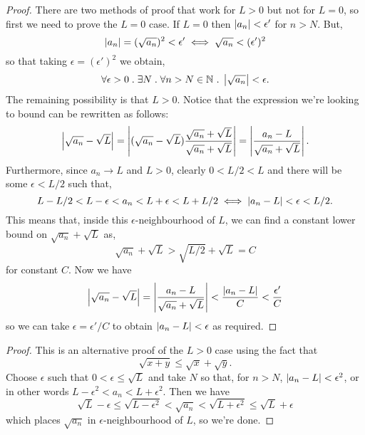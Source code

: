 \documentclass[../MathsNotesBase.tex]{subfiles}
\begin{document}
{\begin{exe}
{\begin{proof}
					There are two methods of proof that work for ${ L > 0 }$ but not for ${ L = 0 }$, so first we need to prove the ${ L = 0 }$ case. If ${ L = 0 }$ then ${ \left\lvert a_n\right\rvert < \epsilon' }$ for ${ n > N }$. But,
					\[ \left\lvert a_n\right\rvert = (\sqrt{a_n})^2 < \epsilon' \iff \sqrt{a_n} < (\epsilon')^2 \]
					so that taking ${ \epsilon = (\epsilon')^2 }$ we obtain,
					\[ \forall \epsilon > 0 \;.\; \exists N \;.\; \forall n > N \in \mathbb{N}^{} \;.\; \left\lvert\sqrt{a_n}\right\rvert < \epsilon. \]
					The remaining possibility is that ${ L > 0 }$. Notice that the expression we're looking to bound can be rewritten as follows:
					\[ \left\lvert\sqrt{a_n} - \sqrt{L}\right\rvert = \left\lvert(\sqrt{a_n} - \sqrt{L})\frac{\sqrt{a_n} + \sqrt{L}}{\sqrt{a_n} + \sqrt{L}}\right\rvert = \left\lvert\frac{a_n - L}{\sqrt{a_n} + \sqrt{L}}\right\rvert. \]
					Furthermore, since ${ a_n \to L }$ and ${ L > 0 }$, clearly ${ 0 < L/2 < L }$ and there will be some ${ \epsilon < L/2 }$ such that,
					\[ L - L/2 < L - \epsilon < a_n < L + \epsilon < L + L/2 \iff \left\lvert a_n - L\right\rvert <\epsilon < L/2. \]
					This means that, inside this $\epsilon$-neighbourhood of $L$, we can find a constant lower bound on ${ \sqrt{a_n} + \sqrt{L} }$ as,
					\[ \sqrt{a_n} + \sqrt{L} > \sqrt{L/2} + \sqrt{L} = C \]
					for constant $C$. Now we have
					\[ \left\lvert\sqrt{a_n} - \sqrt{L}\right\rvert = \left\lvert\frac{a_n - L}{\sqrt{a_n} + \sqrt{L}}\right\rvert < \frac{\left\lvert a_n - L\right\rvert}{C} < \frac{\epsilon'}{C} \]
					so we can take ${ \epsilon = \epsilon'/C }$ to obtain ${ \left\lvert a_n - L\right\rvert < \epsilon }$ as required.
				\end{proof}
				\begin{proof}
					This is an alternative proof of the ${ L > 0 }$ case using the fact that
					\[ \sqrt{x + y} \leq \sqrt{x} + \sqrt{y}. \]
					Choose $\epsilon$ such that ${ 0 < \epsilon \leq \sqrt{L} }$ and take $N$ so that, for ${ n > N }$, ${ \left\lvert a_n - L\right\rvert < \epsilon^2 }$, or in other words ${ L - \epsilon^2 < a_n < L + \epsilon^2 }$. Then we have
					\[ \sqrt{L} - \epsilon \leq \sqrt{L - \epsilon^2} < \sqrt{a_n} < \sqrt{L + \epsilon^2} \leq \sqrt{L} + \epsilon \]
					which places $\sqrt{a_n}$ in $\epsilon$-neighbourhood of $L$, so we're done.
				\end{proof}
			}
			\bigskip
\end{exe}}
\end{document}
